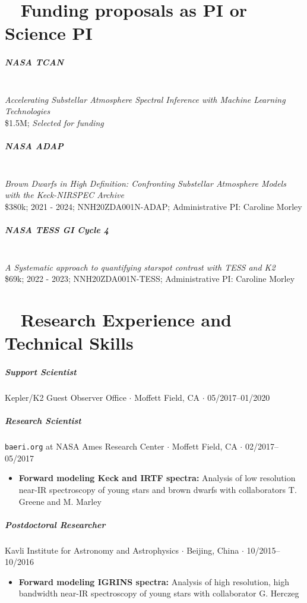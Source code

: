 \documentclass[10pt,letterpaper]{article}
\begin{document}
\section*{\faMoneyCheck* ~ Funding proposals as PI or Science PI }

\subparagraph{NASA TCAN}\mbox{}\\
\emph{Accelerating Substellar Atmosphere Spectral Inference with Machine Learning Technologies} \\
\$1.5M; \emph{Selected for funding}

\subparagraph{NASA ADAP}\mbox{}\\
\emph{Brown Dwarfs in High Definition: Confronting Substellar Atmosphere Models with the Keck-NIRSPEC Archive} \\
\$380k; 2021 - 2024; NNH20ZDA001N-ADAP; Administrative PI: Caroline Morley


\subparagraph{NASA TESS GI Cycle 4}\mbox{}\\
\emph{A Systematic approach to quantifying starspot contrast with TESS and K2}\\
\$69k; 2022 - 2023; NNH20ZDA001N-TESS; Administrative PI: Caroline Morley


\section*{\faWrench ~ Research Experience and Technical Skills}

\subparagraph{Support Scientist}
Kepler/K2 Guest Observer Office $\cdot$ Moffett Field, CA $\cdot$ 05/2017--01/2020

\subparagraph{Research Scientist}
\texttt{baeri.org} at NASA Ames Research Center $\cdot$ Moffett Field, CA $\cdot$ 02/2017--05/2017
\begin{itemize}
    \item  \textbf{Forward modeling Keck and IRTF spectra:} Analysis of low resolution near-IR spectroscopy of young stars and brown dwarfs with collaborators T. Greene and M. Marley
\end{itemize}

\subparagraph{Postdoctoral Researcher}
Kavli Institute for Astronomy and Astrophysics $\cdot$ Beijing, China $\cdot$ 10/2015--10/2016
\begin{itemize}
    \item  \textbf{Forward modeling IGRINS spectra:} Analysis of high resolution, high bandwidth near-IR spectroscopy of young stars with collaborator G. Herczeg
\end{itemize}
\end{document}
